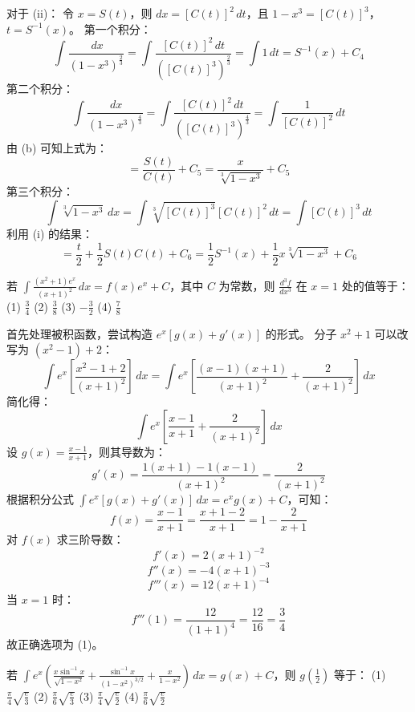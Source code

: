 \begin{questions}
\begin{parts}
\begin{solution}
对于 (ii)：
令 $x = S(t)$，则 $dx = [C(t)]^2 \,dt$，且 $1 - x^3 = [C(t)]^3$，$t = S^{-1}(x)$。
第一个积分：
\[
\int \frac{\,dx}{\left(1-x^3\right)^{\frac{2}{3}}} = \int \frac{[C(t)]^2 \,dt}{\left([C(t)]^3\right)^{\frac{2}{3}}} = \int 1 \,dt = S^{-1}(x) + C_4
\]
第二个积分：
\[
\int \frac{\,dx}{\left(1-x^3\right)^{\frac{4}{3}}} = \int \frac{[C(t)]^2 \,dt}{\left([C(t)]^3\right)^{\frac{4}{3}}} = \int \frac{1}{[C(t)]^2} \,dt
\]
由 (b) 可知上式为：
\[
= \frac{S(t)}{C(t)} + C_5 = \frac{x}{\sqrt[3]{1-x^3}} + C_5
\]
第三个积分：
\[
\int \sqrt[3]{1-x^3} \,dx = \int \sqrt[3]{[C(t)]^3} [C(t)]^2 \,dt = \int [C(t)]^3 \,dt
\]
利用 (i) 的结果：
\[
= \frac{t}{2} + \frac{1}{2}S(t)C(t) + C_6 = \frac{1}{2}S^{-1}(x) + \frac{1}{2}x\sqrt[3]{1-x^3} + C_6
\]
\end{solution}
\end{parts}

    \question
若 $\int \frac{(x^2+1)e^x}{(x+1)^2} \,dx = f(x)e^x + C$，其中 $C$ 为常数，则 $\frac{d^3f}{dx^3}$ 在 $x = 1$ 处的值等于：
(1) $\frac{3}{4}$ \quad (2) $\frac{3}{8}$ \quad (3) $-\frac{3}{2}$ \quad (4) $\frac{7}{8}$

\begin{solution}
首先处理被积函数，尝试构造 $e^x [g(x) + g'(x)]$ 的形式。
分子 $x^2 + 1$ 可以改写为 $(x^2 - 1) + 2$：
\[
\int e^x \left[ \frac{x^2 - 1 + 2}{(x+1)^2} \right] \,dx = \int e^x \left[ \frac{(x-1)(x+1)}{(x+1)^2} + \frac{2}{(x+1)^2} \right] \,dx
\]
简化得：
\[
\int e^x \left[ \frac{x-1}{x+1} + \frac{2}{(x+1)^2} \right] \,dx
\]
设 $g(x) = \frac{x-1}{x+1}$，则其导数为：
\[
g'(x) = \frac{1(x+1) - 1(x-1)}{(x+1)^2} = \frac{2}{(x+1)^2}
\]
根据积分公式 $\int e^x [g(x) + g'(x)] \,dx = e^x g(x) + C$，可知：
\[
f(x) = \frac{x-1}{x+1} = \frac{x+1-2}{x+1} = 1 - \frac{2}{x+1}
\]
对 $f(x)$ 求三阶导数：
\[
f'(x) = 2(x+1)^{-2}
\]
\[
f''(x) = -4(x+1)^{-3}
\]
\[
f'''(x) = 12(x+1)^{-4}
\]
当 $x = 1$ 时：
\[
f'''(1) = \frac{12}{(1+1)^4} = \frac{12}{16} = \frac{3}{4}
\]
故正确选项为 (1)。
\end{solution}
\question
若 $\int e^x \left( \frac{x \sin^{-1} x}{\sqrt{1-x^2}} + \frac{\sin^{-1} x}{(1-x^2)^{3/2}} + \frac{x}{1-x^2} \right) \,dx = g(x) + C$，则 $g\left(\frac{1}{2}\right)$ 等于：
(1) $\frac{\pi}{4} \sqrt{\frac{e}{3}}$ \quad (2) $\frac{\pi}{6} \sqrt{\frac{e}{3}}$ \quad (3) $\frac{\pi}{4} \sqrt{\frac{e}{2}}$ \quad (4) $\frac{\pi}{6} \sqrt{\frac{e}{2}}$


\end{questions}
